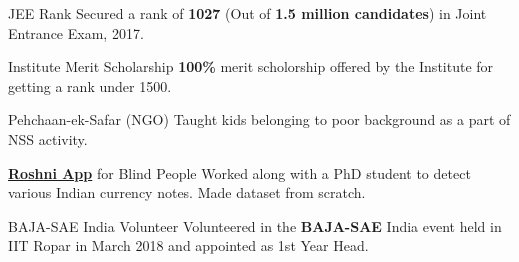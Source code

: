 
\begin{misc}

    \cvskill
    {JEE Rank} %
    {{Secured a rank of }\textbf{1027} { (Out of \textbf{1.5 million candidates}) }{in Joint Entrance Exam, 2017.}}
 
\cvskill
    {Institute Merit Scholarship} %
    {{\textbf{100\%} merit scholorship offered by the Institute for getting a rank under 1500.}}


\cvskill
{Pehchaan-ek-Safar (NGO)} %
{{Taught kids belonging to poor background as a part of NSS activity.}}

\cvskill
    {\href{https://www.digit.in/news/apps/roshni-an-android-app-to-help-the-visually-impaired-recognize-currency-notes-46026.html}{\textbf{Roshni App}} for Blind People} %
    {{Worked along with a PhD student to detect various Indian currency notes. Made dataset from scratch.}}


\cvskill
    {BAJA-SAE India Volunteer} %
    {{Volunteered in the \textbf{BAJA-SAE} India event held in IIT Ropar in March 2018 and appointed as 1st Year Head.}}



\end{misc}
